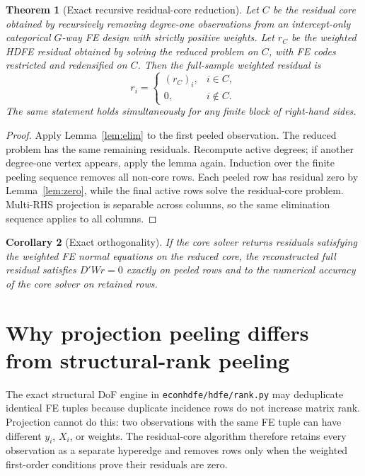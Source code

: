 \documentclass[11pt]{article}
\newtheorem{theorem}{Theorem}[section]
\newtheorem{corollary}[theorem]{Corollary}
\theoremstyle{definition}
\newcommand{\1}{\mathbf{1}}
\begin{document}
\begin{theorem}[Exact recursive residual-core reduction]\label{thm:core}
Let $C$ be the residual core obtained by recursively removing degree-one observations from an intercept-only categorical $G$-way FE design with strictly positive weights. Let $r_C$ be the weighted HDFE residual obtained by solving the reduced problem on $C$, with FE codes restricted and redensified on $C$. Then the full-sample weighted residual is
\[
  r_i = \begin{cases}
    (r_C)_i, & i\in C,\\
    0, & i\notin C.
  \end{cases}
\]
The same statement holds simultaneously for any finite block of right-hand sides.
\end{theorem}
\begin{proof}
Apply Lemma~\ref{lem:elim} to the first peeled observation. The reduced problem has the same remaining residuals. Recompute active degrees; if another degree-one vertex appears, apply the lemma again. Induction over the finite peeling sequence removes all non-core rows. Each peeled row has residual zero by Lemma~\ref{lem:zero}, while the final active rows solve the residual-core problem. Multi-RHS projection is separable across columns, so the same elimination sequence applies to all columns.
\end{proof}

\begin{corollary}[Exact orthogonality]
If the core solver returns residuals satisfying the weighted FE normal equations on the reduced core, the reconstructed full residual satisfies $D'Wr=0$ exactly on peeled rows and to the numerical accuracy of the core solver on retained rows.
\end{corollary}

\section{Why projection peeling differs from structural-rank peeling}

The exact structural DoF engine in \texttt{econhdfe/hdfe/rank.py} may deduplicate identical FE tuples because duplicate incidence rows do not increase matrix rank. Projection cannot do this: two observations with the same FE tuple can have different $y_i$, $X_i$, or weights. The residual-core algorithm therefore retains every observation as a separate hyperedge and removes rows only when the weighted first-order conditions prove their residuals are zero.
\end{document}

